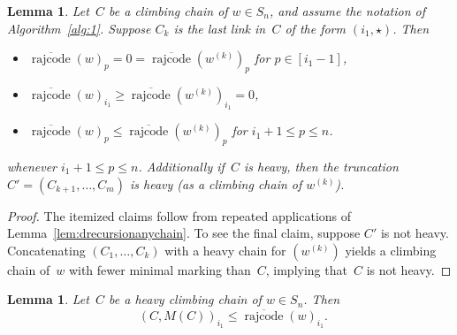 \documentclass[10pt,a4paper]{amsart}
\DeclareMathOperator{\dwt}{\overline{\mathrm{wt}}}
\DeclareMathOperator{\rr}{\mathrm{rajcode}}
\newcommand{\orr}{\overline{\rr}}
\newtheorem{lemma}[theorem]{Lemma}
\begin{document}
\setcounter{section}{9}\setcounter{theorem}{2}
\begin{lemma}
	\label{lem:heavytruncation}
	Let~$C$ be a climbing chain of $w\in S_n$, and assume the notation of Algorithm~\ref{alg:1}.
	Suppose $C_k$ is the last link in~$C$ of the form $(i_1,\star)$. Then 
	\begin{itemize}
		\item $\orr(w)_p=0=\orr(w^{(k)})_p$ for $p\in [i_1-1]$,
		\item $\orr(w)_{i_1}\geq \orr(w^{(k)})_{i_1}=0$,
		\item $\orr(w)_p\leq \orr(w^{(k)})_p$ for $i_1+1\leq p \leq n$.
	\end{itemize}
	whenever $i_1+1\leq p\leq n$. Additionally if~$C$ is heavy, then the truncation $C'=(C_{k+1},\ldots,C_m)$ is heavy (as a climbing chain of $w^{(k)}$).
\end{lemma}

\begin{proof}
	The itemized claims follow from repeated applications of Lemma~\ref{lem:drecursionanychain}. To see the final claim, suppose $C'$ is not heavy. Concatenating $(C_1,\ldots,C_{k})$ with a heavy chain for $(w^{(k)})$ yields a climbing chain of~$w$ with fewer minimal marking than~$C$, implying that~$C$ is not heavy.
\end{proof}

\setcounter{section}{9}\setcounter{theorem}{3}
\begin{lemma}
	\label{lem:heavymaxfirstmarks}
	Let~$C$ be a heavy climbing chain of $w\in S_n$. Then
	\[\dwt(C,M(C))_{i_1}\leq \orr(w)_{i_1}. \]
\end{lemma}
\end{document}
